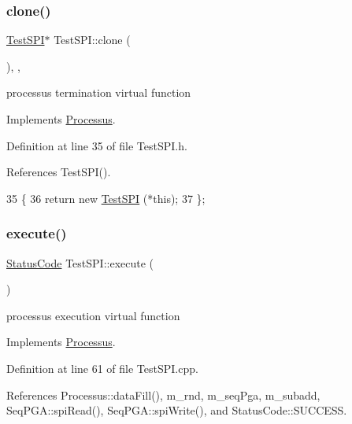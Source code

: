 \subsubsection{\texorpdfstring{clone()}{clone()}}
{\footnotesize\ttfamily \hyperlink{classTestSPI_1_1TestSPI}{Test\+S\+PI}$\ast$ Test\+S\+P\+I\+::clone (\begin{DoxyParamCaption}{ }\end{DoxyParamCaption})\hspace{0.3cm}{\ttfamily [inline]}, {\ttfamily [protected]}, {\ttfamily [virtual]}}

processus termination virtual function 

Implements \hyperlink{classProcessus_aca8856f6d6d7b7e1fe941f298dcbb502}{Processus}.



Definition at line 35 of file Test\+S\+P\+I.\+h.



References Test\+S\+P\+I().


\begin{DoxyCode}
35                   \{
36     \textcolor{keywordflow}{return} \textcolor{keyword}{new} \hyperlink{classTestSPI_a0a4bc6b63f406b3c2830c14873b1ce54}{TestSPI} (*\textcolor{keyword}{this});
37   \};
\end{DoxyCode}
\mbox{\label{classTestSPI_afe77bfff2e5454c8b3d012721d1f0a99}} 
\subsubsection{\texorpdfstring{execute()}{execute()}}
{\footnotesize\ttfamily \hyperlink{classStatusCode}{Status\+Code} Test\+S\+P\+I\+::execute (\begin{DoxyParamCaption}{ }\end{DoxyParamCaption})\hspace{0.3cm}{\ttfamily [virtual]}}

processus execution virtual function 

Implements \hyperlink{classProcessus_a63767a63a1fb0055c5aa45b21a4a5d58}{Processus}.



Definition at line 61 of file Test\+S\+P\+I.\+cpp.



References Processus\+::data\+Fill(), m\+\_\+rnd, m\+\_\+seq\+Pga, m\+\_\+subadd, Seq\+P\+G\+A\+::spi\+Read(), Seq\+P\+G\+A\+::spi\+Write(), and Status\+Code\+::\+S\+U\+C\+C\+E\+SS.




